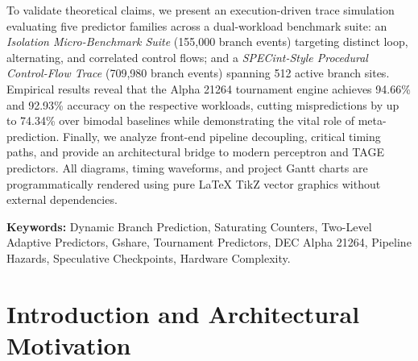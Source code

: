 \documentclass[11pt,a4paper]{article}
\begin{document}
\vspace{0.6em}
\noindent
To validate theoretical claims, we present an execution-driven trace simulation evaluating five predictor families across a dual-workload benchmark suite: an \textit{Isolation Micro-Benchmark Suite} (155,000 branch events) targeting distinct loop, alternating, and correlated control flows; and a \textit{SPECint-Style Procedural Control-Flow Trace} (709,980 branch events) spanning 512 active branch sites. Empirical results reveal that the Alpha 21264 tournament engine achieves 94.66\% and 92.93\% accuracy on the respective workloads, cutting mispredictions by up to 74.34\% over bimodal baselines while demonstrating the vital role of meta-prediction. Finally, we analyze front-end pipeline decoupling, critical timing paths, and provide an architectural bridge to modern perceptron and TAGE predictors. All diagrams, timing waveforms, and project Gantt charts are programmatically rendered using pure \LaTeX{} TikZ vector graphics without external dependencies.

\vspace{2.0em}
\noindent\textbf{Keywords:} Dynamic Branch Prediction, Saturating Counters, Two-Level Adaptive Predictors, Gshare, Tournament Predictors, DEC Alpha 21264, Pipeline Hazards, Speculative Checkpoints, Hardware Complexity.

\clearpage

\tableofcontents
\clearpage

\listoffigures
\vspace{2.0em}
\listoftables
\clearpage

\setcounter{page}{1}

\section{Introduction and Architectural Motivation}
\label{sec:intro}
\end{document}
